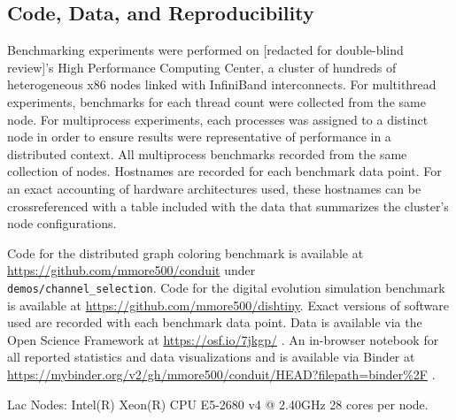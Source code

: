 \subsection{Code, Data, and Reproducibility}

Benchmarking experiments were performed on [redacted for double-blind review]'s High Performance Computing Center, a cluster of hundreds of heterogeneous x86 nodes linked with InfiniBand interconnects.
For multithread experiments, benchmarks for each thread count were collected from the same node.
For multiprocess experiments, each processes was assigned to a distinct node in order to ensure results were representative of performance in a distributed context.
All multiprocess benchmarks recorded from the same collection of nodes.
Hostnames are recorded for each benchmark data point.
For an exact accounting of hardware architectures used, these hostnames can be crossreferenced with a table included with the data that summarizes the cluster's node configurations.

Code for the distributed graph coloring benchmark is available at \url{https://github.com/mmore500/conduit} under \\ \texttt{demos/channel\_selection}.
Code for the digital evolution simulation benchmark is available at \url{https://github.com/mmore500/dishtiny}.
Exact versions of software used are recorded with each benchmark data point.
Data is available via the Open Science Framework at \url{https://osf.io/7jkgp/} \cite{foster2017open}.
An in-browser notebook for all reported statistics and data visualizations and is available via Binder at \url{https://mybinder.org/v2/gh/mmore500/conduit/HEAD?filepath=binder\%2F} \cite{jupyter2018binder}.


Lac Nodes: Intel(R) Xeon(R) CPU E5-2680 v4 @ 2.40GHz	28 cores per node.
